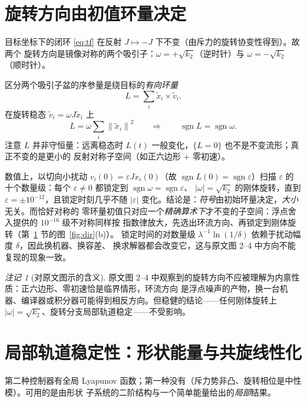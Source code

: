 \documentclass[11pt,a4paper]{ctexart}
\theoremstyle{plain}
\theoremstyle{definition}
\theoremstyle{remark}
\newtheorem{remark}{注记}
\newcommand{\txi}{\tilde{x}}
\newcommand{\tv}{\tilde{v}}
\newcommand{\norm}[1]{\left\|#1\right\|}
\newcommand{\abs}[1]{\left|#1\right|}
\DeclareMathOperator{\sgn}{sgn}
\begin{document}
\section{旋转方向由初值环量决定}
\label{sec:dir}

目标坐标下的闭环 \eqref{eq:tf} 在反射 $J\mapsto-J$ 下不变（由斥力的旋转协变性得到）。故两个
旋转方向是镜像对称的两个吸引子：$\omega=+\sqrt{k_2}$（逆时针）与 $\omega=-\sqrt{k_2}$（顺时针）。

区分两个吸引子盆的序参量是绕目标的\emph{有向环量}
\begin{equation}
  L=\sum_i\txi_i\times\tv_i .
  \label{eq:L}
\end{equation}
在旋转稳态 $\tv_i=\omega J\txi_i$ 上
\begin{equation}
  L=\omega\sum_i\norm{\txi_i}^2
  \qquad\Longrightarrow\qquad
  \sgn L=\sgn\omega .
  \label{eq:Lsign}
\end{equation}
注意 $L$ 并非守恒量：远离稳态时 $L(t)$ 一般变化，$\{L=0\}$ 也不是不变流形；真正不变的是更小的
反射对称子空间（如正六边形 $+$ 零初速）。

数值上，以切向小扰动 $v_i(0)=\varepsilon Jx_i(0)$（故 $\sgn L(0)=\sgn\varepsilon$）扫描
$\varepsilon$ 的十个数量级：每个 $\varepsilon\ne0$ 都锁定到 $\sgn\omega=\sgn\varepsilon$、
$|\omega|=\sqrt{k_2}$ 的刚体旋转，直到 $\varepsilon=\pm10^{-12}$，且锁定时刻几乎不随
$\abs{\varepsilon}$ 变化。结论是：\emph{符号}由初始环量决定，\emph{大小}无关。而恰好对称的
零环量初值只对应一个\emph{精确算术下}才不变的子空间：浮点舍入提供的 $10^{-16}$ 级不对称同样按
指数律放大，先选出环流方向、再锁定到刚体旋转（第~\ref{sec:dir} 节的图~\ref{fig:dir}(b)）。
锁定时间的对数量级 $\lambda^{-1}\ln(1/\delta)$ 依赖于扰动幅度 $\delta$，因此换机器、换容差、
换求解器都会改变它，这与原文图 2--4 中方向不能复现的现象一致。

\begin{remark}[对原文图示的含义]
原文图 2--4 中观察到的旋转方向不应被理解为内禀性质：正六边形、零初速恰是临界情形，环流方向
是浮点噪声的产物，换一台机器、编译器或积分器可能得到相反方向。但稳健的结论——任何刚体旋转上
$|\omega|=\sqrt{k_2}$、旋转分支局部轨道稳定——不受影响。
\end{remark}

\section{局部轨道稳定性：形状能量与共旋线性化}
\label{sec:stab}

第二种控制器有全局 Lyapunov 函数；第一种没有（斥力势非凸、旋转相位是中性模）。可用的是由形状
子系统的二阶结构与一个简单能量给出的\emph{局部}结果。
\end{document}
